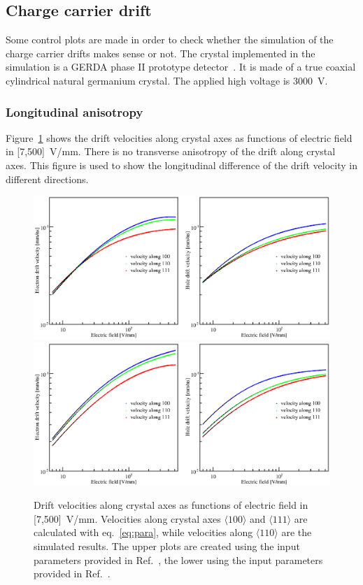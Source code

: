 \subsection{Charge carrier drift}
\label{subsec:drift}
Some control plots are made in order to check whether the simulation of the charge carrier drifts makes sense or not. The crystal implemented in the simulation is a GERDA phase II prototype detector~\cite{Siegfried}. It is made of a true coaxial cylindrical natural germanium crystal. The applied high voltage is 3000~V.

\subsubsection{Longitudinal anisotropy}
\label{subsec:long}
Figure~\ref{fig:vvse} shows the drift velocities along crystal axes as functions of electric field in [7,500]~V/mm. There is no transverse anisotropy of the drift along crystal axes. This figure is used to show the longitudinal difference of the drift velocity in different directions. 
\begin{figure}[tbhp]
  \centering
  \includegraphics[width=1.0\textwidth]{VvsElucian} \\\hfil
  \includegraphics[width=1.0\textwidth]{VvsEbart}
  \caption{Drift velocities along crystal axes as functions of electric field in [7,500]~V/mm. Velocities along crystal axes $\langle 100 \rangle$ and $\langle 111 \rangle$ are calculated with eq.~\ref{eq:para}, while velocities along $\langle 110 \rangle$ are the simulated results. The upper plots are created using the input parameters provided in Ref.~\cite{miha}, the lower using the input parameters provided in Ref.~\cite{bart}.}
  \label{fig:vvse}
\end{figure}

